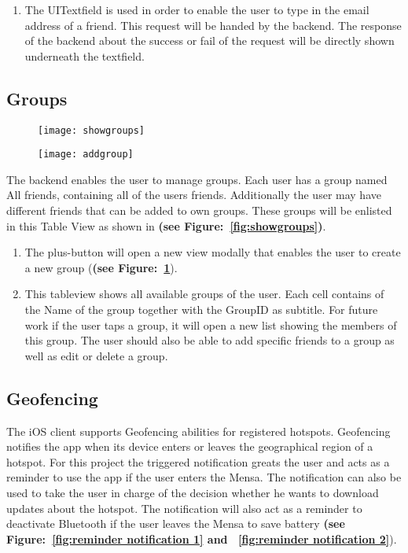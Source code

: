 \begin{enumerate}
\item The UITextfield is used in order to enable the user to type in the email address of a friend. This request will be handed by the backend. The response of the backend about the success or fail of the request will be directly shown underneath the textfield.
\end{enumerate}

\subsection{Groups}

\begin{figure}
\centering
\begin{minipage}{.5\textwidth}
  \centering
  \texttt{[image: showgroups]}
  \label{fig:showgroups}
\end{minipage}%
\begin{minipage}{.5\textwidth}
  \centering
  \texttt{[image: addgroup]}
  \label{fig:addgroup}
\end{minipage}
\end{figure}

The backend enables the user to manage groups. Each user has a group named All friends, containing all of the users friends. Additionally the user may have different friends that can be added to own groups. These groups will be enlisted in this Table View as shown in \textbf{(see Figure:~\ref{fig:showgroups})}.

\begin{enumerate}
 \item The plus-button will open a new view modally that enables the user to create a new group (\textbf{(see Figure:~\ref{fig:addgroup}}).
 \item This tableview shows all available groups of the user. Each cell contains of the Name of the group together with the GroupID as subtitle. For future work if the user taps a group, it will open a new list showing the members of this group. The user should also be able to add specific friends to a group as well as edit or delete a group.
\end{enumerate}

\subsection{Geofencing}
The iOS client supports Geofencing abilities for registered hotspots. Geofencing notifies the app when its device enters or leaves the geographical region of a hotspot. For this project the triggered notification greats the user and acts as a reminder to use the app if the user enters the Mensa. The notification can also be used to take the user in charge of the decision whether he wants to download updates about the hotspot. The notification will also act as a reminder to deactivate Bluetooth if the user leaves the Mensa to save battery \textbf{(see Figure:~\ref{fig:reminder notification 1} and ~\ref{fig:reminder notification 2}}).

